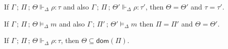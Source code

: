 \documentclass{article}
\newcommand{\mf}[1]{\mathsf{#1}}
\newcommand{\semi}{\,;\,}
\newcommand{\dom}{\mf{dom}}
\newcommand{\rtp}{\tau}
\newcommand{\tmeml}[4]{#1 \semi #2 \semi #3 \vDash_\Delta #4}
\newcommand{\trhol}[5]{#1 \semi #2 \semi #3 \Vdash_\Delta #4: #5}
\begin{document}
\begin{proposition}
\label{thm:linunique}
If $\trhol{\Gamma}{\Pi}{\Theta}{\rho}{\rtp}$
and also $\trhol{\Gamma}{\Pi}{\Theta'}{\rho}{\rtp'}$,
then $\Theta=\Theta'$ and $\rtp = \rtp'$.
\end{proposition}

\begin{proposition}
\label{thm:memunique}
If $\tmeml{\Gamma}{\Pi}{\Theta}{m}$
and also $\tmeml{\Gamma}{\Pi'}{\Theta'}{m}$
then $\Pi=\Pi'$ and $\Theta = \Theta'$.
\end{proposition}

\begin{proposition}
\label{thm:contain}
If $\trhol{\Gamma}{\Pi}{\Theta}{\rho}{\rtp}$,
then $\Theta \subseteq \dom(\Pi)$.
\end{proposition}
\end{document}
